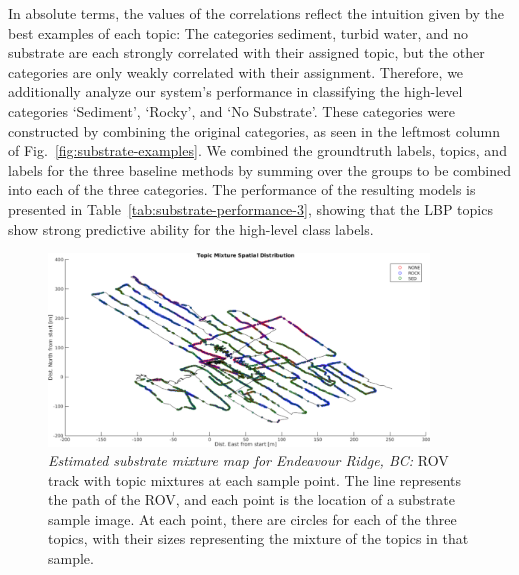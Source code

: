 \begin{table}
\end{table}

In absolute terms, the values of the correlations reflect the intuition given by the best examples of each topic: The categories sediment, turbid water, and no substrate are each strongly correlated with their assigned topic, but the other categories are only weakly correlated with their assignment. Therefore, we additionally analyze our system's performance in classifying the high-level categories ‘Sediment’, ‘Rocky’, and ‘No Substrate’. These categories were constructed by combining the original categories, as seen in the leftmost column of Fig.~\ref{fig:substrate-examples}. We combined the groundtruth labels, topics, and labels for the three baseline methods by summing over the groups to be combined into each of the three categories. The performance of the resulting models is presented in Table~\ref{tab:substrate-performance-3}, showing that the LBP topics show strong predictive ability for the high-level class labels.

\begin{figure}
    \centering
    \includegraphics[width=0.9\textwidth]{figures/wacv/mixture-map2.pdf}
    \caption{\emph{Estimated substrate mixture map for Endeavour Ridge, BC:} ROV track with topic mixtures at each sample point. The line represents the path of the ROV, and each point is the location of a substrate sample image. At each point, there are circles for each of the three topics, with their sizes representing the mixture of the topics in that sample.}
    \label{fig:substrate-topic-map}
\end{figure}

